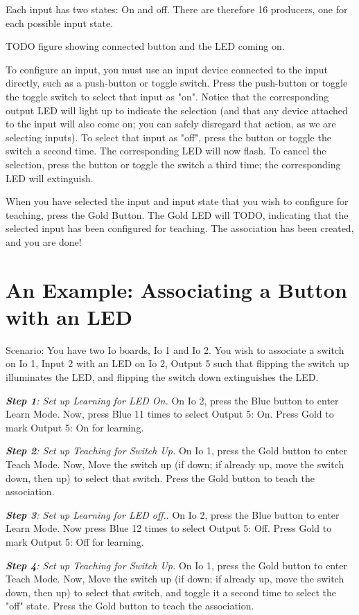 \documentclass[12pt]{book}
\begin{document}
Each input has two states: On and off. There are therefore 16 producers, one for each possible input state.

TODO figure showing connected button and the LED coming on.

To configure an input, you must use an input device connected to the input directly, such as a push-button or toggle switch. Press the push-button or toggle the toggle switch to select that input as "on". Notice that the corresponding output LED will light up to indicate the selection (and that any device attached to the input will also come on; you can safely disregard that action, as we are selecting inputs). To select that input as "off", press the button or toggle the switch a second time. The corresponding LED will now flash. To cancel the selection, press the button or toggle the switch a third time; the corresponding LED will extinguish.

When you have selected the input and input state that you wish to configure for teaching, press the Gold Button. The Gold LED will TODO, indicating that the selected input has been configured for teaching.  The association has been created, and you are done!

\section{An Example: Associating a Button with an LED}

Scenario: You have two Io boards, Io 1 and Io 2. You wish to associate a switch on Io 1, Input 2 with an LED on Io 2, Output 5 such that flipping the switch up illuminates the LED, and flipping the switch down extinguishes the LED.

\textit{\textbf{Step 1}: Set up Learning for LED On.} On Io 2, press the Blue button to enter Learn Mode. Now, press Blue 11 times to select Output 5: On. Press Gold to mark Output 5: On for learning.

\textit{\textbf{Step 2}: Set up Teaching for Switch Up.} On Io 1, press the Gold button to enter Teach Mode. Now, Move the switch up (if down; if already up, move the switch down, then up) to select that switch. Press the Gold button to teach the association.

\textit{\textbf{Step 3}: Set up Learning for LED off.}. On Io 2, press the Blue button to enter Learn Mode. Now press Blue 12 times to select Output 5: Off. Press Gold to mark Output 5: Off for learning.

\textit{\textbf{Step 4}: Set up Teaching for Switch Up.} On Io 1, press the Gold button to enter Teach Mode. Now, Move the switch up (if down; if already up, move the switch down, then up) to select that switch, and toggle it a second time to select the "off" state. Press the Gold button to teach the association.
\end{document}
